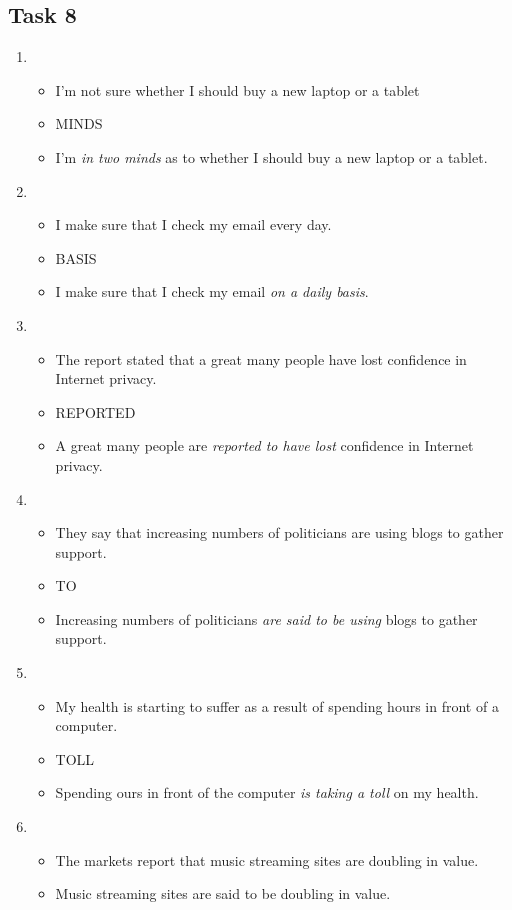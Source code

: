 \documentclass[a4paper]{article}
\begin{document}
\subsection{Task 8}
\begin{enumerate}
    \item \begin{itemize}
        \item I'm not sure whether I should buy a new laptop or a tablet
        \item MINDS
        \item I'm \emph{in two minds} as to whether I should buy a new laptop or a tablet.
    \end{itemize}
    \item \begin{itemize}
        \item I make sure that I check my email every day.
        \item BASIS
        \item I make sure that I check my email \emph{on a daily basis}.
    \end{itemize}
    \item \begin{itemize}
        \item The report stated that a great many people have lost confidence in Internet privacy.
        \item REPORTED
        \item A great many people are \emph{reported to have lost} confidence in Internet privacy.
    \end{itemize}
    \item \begin{itemize}
        \item They say that increasing numbers of politicians are using blogs to gather support.
        \item TO
        \item Increasing numbers of politicians \emph{are said to be using} blogs to gather support.
    \end{itemize}
    \item \begin{itemize}
        \item My health is starting to suffer as a result of spending hours in front of a computer.
        \item TOLL
        \item Spending ours in front of the computer \emph{is taking a toll} on my health.
    \end{itemize}
    \item \begin{itemize}
        \item The markets report that music streaming sites are doubling in value.
        \item Music streaming sites are said to be doubling in value.
    \end{itemize}
\end{enumerate}
\end{document}
